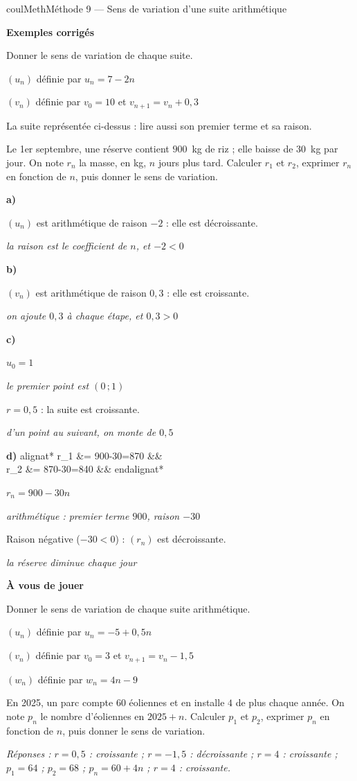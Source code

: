 \documentclass[11pt,a4paper]{article}
\makeatletter
\newlength{\retraitcalculs}
\newcounter{lycee@signet}
\newcommand{\signet}[3][]{\stepcounter{lycee@signet}%
  \edef\lycee@dest{\if\relax\detokenize{#1}\relax
    signet.\arabic{lycee@signet}\else#1\fi}%
  \hypertarget{\lycee@dest}{}\bookmark[level=#2,dest=\lycee@dest]{#3}}
\def\textsuperscript#1{#1}\def\dfrac#1#2{#1/#2}\def\frac#1#2{#1/#2}%
\newcommand{\res}[1]{#1}
\newcounter{methode}
\newenvironment{methodebox}[1][Méthode]{\stepcounter{methode}%
  \begin{boitecours}[phantom={\signet[methode-\arabic{methode}]{2}{#1}}]{coulMeth}{#1}}%
  {\end{boitecours}}
\newcommand{\etape}[1]{\par\smallskip\textbf{\color{coulMeth}#1}\par\nobreak\smallskip}
\newcommand{\reponse}[1]{\par\smallskip
  {\footnotesize\itshape\color{black!55}Réponses : #1}}
\newenvironment{calculs}{\setlength{\jot}{5pt}\@fleqntrue\@mathmargin\retraitcalculs
  \setlength{\abovedisplayskip}{4pt}\setlength{\belowdisplayskip}{4pt}%
  \setlength{\abovedisplayshortskip}{4pt}\setlength{\belowdisplayshortskip}{4pt}%
  \csname alignat*\endcsname{2}}%
  {\csname endalignat*\endcsname}
\newcommand{\rem}[1]{\text{\small\itshape\color{black!60}#1}}
\newcommand{\explique}[2]{\par\smallskip\noindent
  \begin{minipage}[t]{0.57\linewidth}\raggedright #1\end{minipage}\hfill
  \begin{minipage}[t]{0.40\linewidth}\raggedright\leavevmode
    {\small\itshape\color{black!60}#2}\end{minipage}\par}
\newcommand{\cas}[1]{\par\smallskip\noindent\textbf{\color{coulExo}#1}\vadjust{\nobreak}}
\newenvironment{correction}{\par}{\par}
\newcommand{\etapeexemples}{\etape{Exemples corrigés}}
\makeatother
\begin{document}
\begin{methodebox}[Méthode 9 --- Sens de variation d'une suite arithmétique]
\etapeexemples
Donner le sens de variation de chaque suite.
\begin{questions}[label=\alph*)]
  \item $(u_{n})$ définie par $u_{n}=7-2n$
  \item $(v_{n})$ définie par $v_{0}=10$ et $v_{n+1}=v_{n}+0{,}3$
  \item La suite représentée ci-dessus : lire aussi son premier terme et sa raison.
  \item Le 1\textsuperscript{er} septembre, une réserve contient $900$~kg de riz ; elle
        baisse de $30$~kg par jour. On note $r_{n}$ la masse, en kg, $n$ jours plus tard.
        Calculer $r_{1}$ et $r_{2}$, exprimer $r_{n}$ en fonction de $n$, puis donner le
        sens de variation.
\end{questions}
\begin{correction}
\cas{a)}
\explique{$(u_{n})$ est arithmétique de raison $-2$ : elle est \res{décroissante}.}{la
raison est le coefficient de $n$, et $-2<0$}
\cas{b)}
\explique{$(v_{n})$ est arithmétique de raison $0{,}3$ : elle est \res{croissante}.}{on
ajoute $0{,}3$ à chaque étape, et $0{,}3>0$}
\cas{c)}
\explique{$u_{0}=\res{1}$}{le premier point est $(0\,;1)$}
\explique{$r=\res{0{,}5}$ : la suite est \res{croissante}.}{d'un point au suivant, on monte de
$0{,}5$}
\cas{d)}
\begin{calculs}
r_{1} &= 900-30=\res{870} &\qquad& \rem{on retire $30$ chaque jour}\\
r_{2} &= 870-30=\res{840} &&
\end{calculs}
\explique{$r_{n}=\res{900-30n}$}{arithmétique : premier terme $900$, raison $-30$}
\explique{Raison négative ($-30<0$) : $(r_{n})$ est \res{décroissante}.}{la réserve diminue chaque
jour}
\end{correction}

\etape{À vous de jouer}
Donner le sens de variation de chaque suite arithmétique.
\begin{questions}[label=\alph*)]
  \item $(u_{n})$ définie par $u_{n}=-5+0{,}5n$
  \item $(v_{n})$ définie par $v_{0}=3$ et $v_{n+1}=v_{n}-1{,}5$
  \item $(w_{n})$ définie par $w_{n}=4n-9$
  \item En 2025, un parc compte $60$ éoliennes et en installe $4$ de plus chaque année. On
        note $p_{n}$ le nombre d'éoliennes en $2025+n$. Calculer $p_{1}$ et $p_{2}$,
        exprimer $p_{n}$ en fonction de $n$, puis donner le sens de variation.
\end{questions}
\reponse{$r=0{,}5$ : croissante ;\; $r=-1{,}5$ : décroissante ;\; $r=4$ : croissante ;\;
$p_{1}=64$ ; $p_{2}=68$ ; $p_{n}=60+4n$ ; $r=4$ : croissante.}
\end{methodebox}
\end{document}
